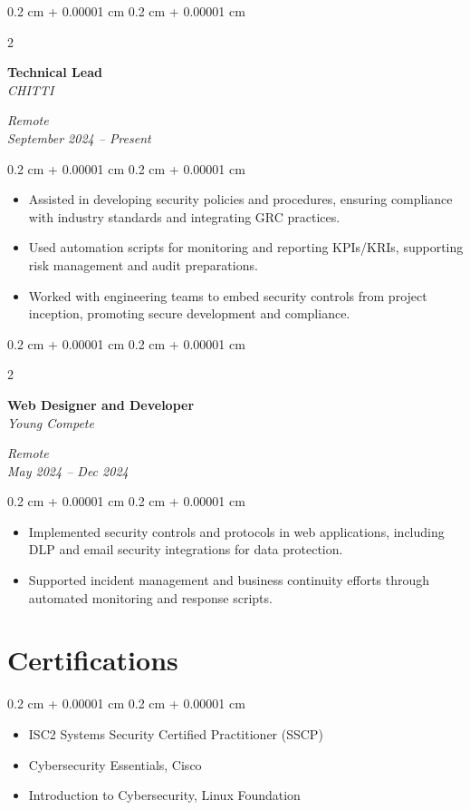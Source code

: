 \documentclass[10pt, letterpaper]{article}
\newenvironment{highlights}{
    \begin{itemize}[
        topsep=0.10 cm,
        parsep=0.10 cm,
        partopsep=0pt,
        itemsep=0pt,
        leftmargin=0.4 cm + 10pt
    ]
}{
    \end{itemize}
} %
\newenvironment{onecolentry}{
    \begin{adjustwidth}{
        0.2 cm + 0.00001 cm
    }{
        0.2 cm + 0.00001 cm
    }
}{
    \end{adjustwidth}
} %
\newenvironment{twocolentry}[2][]{
    \onecolentry
    \def\secondColumn{#2}
    \setcolumnwidth{\fill, 4.5 cm}
    \begin{paracol}{2}
}{
    \switchcolumn \raggedleft \secondColumn
    \end{paracol}
    \endonecolentry
} %
\begin{document}
    \vspace{0.2 cm}
    \begin{twocolentry}{
        \textit{Remote} \\
        \textit{September 2024 – Present}
    }
        \textbf{Technical Lead} \\
        \textit{CHITTI}
    \end{twocolentry}
    \vspace{0.10 cm}
    \begin{onecolentry}
        \begin{highlights}
            \item Assisted in developing security policies and procedures, ensuring compliance with industry standards and integrating GRC practices.
            \item Used automation scripts for monitoring and reporting KPIs/KRIs, supporting risk management and audit preparations.
            \item Worked with engineering teams to embed security controls from project inception, promoting secure development and compliance.
        \end{highlights}
    \end{onecolentry}

    \vspace{0.2 cm}
    \begin{twocolentry}{
        \textit{Remote} \\
        \textit{May 2024 – Dec 2024}
    }
        \textbf{Web Designer and Developer} \\
        \textit{Young Compete}
    \end{twocolentry}
    \vspace{0.10 cm}
    \begin{onecolentry}
        \begin{highlights}
            \item Implemented security controls and protocols in web applications, including DLP and email security integrations for data protection.
            \item Supported incident management and business continuity efforts through automated monitoring and response scripts.
        \end{highlights}
    \end{onecolentry}

    \section{Certifications}
    \begin{onecolentry}
        \begin{highlights}
            \item ISC2 Systems Security Certified Practitioner (SSCP)
            \item Cybersecurity Essentials, Cisco
            \item Introduction to Cybersecurity, Linux Foundation
        \end{highlights}
    \end{onecolentry}
\end{document}
